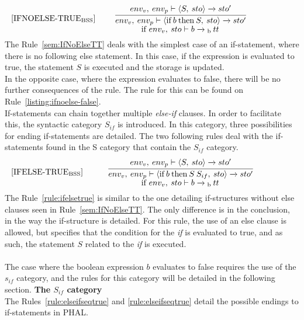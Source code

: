 \begin{equation}\label{sem:IfNoElseTT}
\begin{minipage}{.2\linewidth}
$[\text{IFNOELSE-TRUE}_\text{BSS}]$
\end{minipage}
\begin{minipage}{.8\linewidth}
\centering
$\cfrac{env_v, \: env_p \vdash \langle S, \: sto\rangle \xrightarrow{} sto'}{env_v, \: env_p \vdash \langle \text{if} \: b \: \text{then} \: S, \: sto \rangle \xrightarrow{} sto'}$ 
\\
if $env_v, \: sto \vdash b \xrightarrow{}\textsubscript{b} \: tt$
\end{minipage}
\end{equation}
The Rule~\ref{sem:IfNoElseTT} deals with the simplest case of an if-statement, where there is no following else statement. In this case, if the expression is evaluated to true, the statement $S$ is executed and the storage is updated.\\
In the opposite case, where the expression evaluates to false, there will be no further consequences of the rule. The rule for this can be found on Rule~\ref{listing:ifnoelse-false}.
\\
If-statements can chain together multiple \textit{else-if} clauses. In order to facilitate this, the syntactic category $S_{if}$ is introduced. In this category, three possibilities for ending if-statements are detailed. The two following rules deal with the if-statements found in the S category that contain the $S_{if}$ category.
\begin{equation}\label{rule:ifelsetrue}
\begin{minipage}{.2\linewidth}
$[\text{IFELSE-TRUE}_\text{BSS}]$
\end{minipage}
\begin{minipage}{.8\linewidth}
\centering
$\cfrac{env_v, \: env_p \vdash \langle S, \: sto \rangle \xrightarrow{} sto'}{env_v, \: env_p \vdash \langle \text{if} \: b \: \text{then} \: S \:S_{if}, \: sto \rangle \xrightarrow{} sto'}$ 
\\
if $env_v, \: sto \vdash b \xrightarrow{}\textsubscript{b} \: tt$
\end{minipage}
\end{equation}
The Rule~\ref{rule:ifelsetrue} is similar to the one detailing if-structures without else clauses seen in Rule~\ref{sem:IfNoElseTT}. The only difference is in the conclusion, in the way the if-structure is detailed. For this rule, the use of an else clause is allowed, but specifies that the condition for the \textit{if} is evaluated to true, and as such, the statement $S$ related to the \textit{if} is executed.
\\\\
The case where the boolean expression $b$ evaluates to false requires the use of the $s_{if}$ category, and the rules for this category will be detailed in the following section.
\textbf{The $S_{if}$ category}\\
The Rules~\ref{rule:elseifseqtrue} and \ref{rule:elseifseqtrue} detail the possible endings to if-statements in PHAL.

